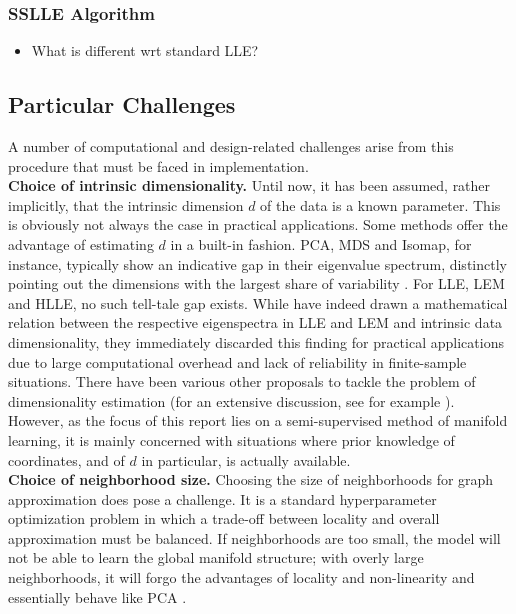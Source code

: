 \subsubsection{SSLLE Algorithm}
\label{algo-sslle}

\begin{itemize}
  \item What is different wrt standard LLE?
\end{itemize}


\subsection{Particular Challenges}
\label{challenges}

A number of computational and design-related challenges arise from this 
procedure that must be faced in implementation.
\\

\textbf{Choice of intrinsic dimensionality.} 
Until now, it has been assumed, rather implicitly, that the intrinsic dimension 
$d$ of the data is a known parameter.
This is obviously not always the case in practical applications.
Some methods offer the advantage of estimating $d$ in a built-in fashion. 
PCA, MDS and Isomap, for instance, typically show an indicative gap in their 
eigenvalue spectrum, distinctly pointing out the dimensions with the largest 
share of variability \citep{sauletal2006}.
For LLE, LEM and HLLE, no such tell-tale gap exists.
While \citet{shasaul2005} have indeed drawn a mathematical relation between the 
respective eigenspectra in LLE and LEM and intrinsic data dimensionality, they 
immediately discarded this finding for practical applications due to large 
computational overhead and lack of reliability in finite-sample situations.
There have been various other proposals to tackle the problem of dimensionality 
estimation (for an extensive discussion, see for example 
\citet{disswissel2017}).
However, as the focus of this report lies on a semi-supervised method of 
manifold learning, it is mainly concerned with situations where prior knowledge 
of coordinates, and of $d$ in particular, is actually available.
\\

\textbf{Choice of neighborhood size.} Choosing the size of neighborhoods for 
graph approximation does pose a challenge.
It is a standard hyperparameter optimization problem in which a trade-off 
between locality and overall approximation must be balanced.
If neighborhoods are too small, the model will not be able to learn the global 
manifold structure; with overly large neighborhoods, it will forgo the 
advantages of locality and non-linearity and essentially behave like PCA 
\citep{deridderduin2002}.

